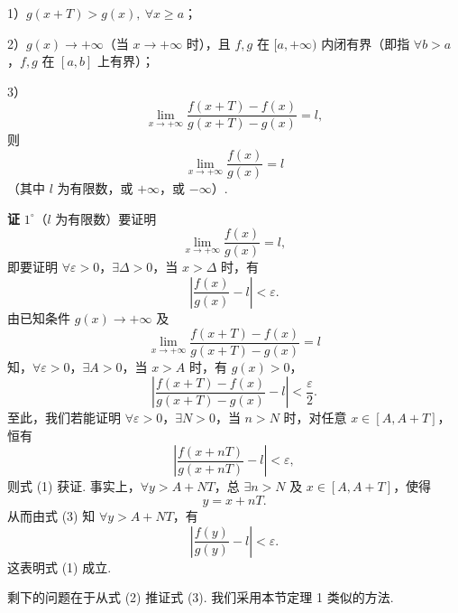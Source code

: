 \documentclass[UTF8, 12pt, fontset=fandol, oneside]{ctexart}
\begin{document}
1）$g(x+T)>g(x),\ \forall x\ge a$；

2）$g(x)\to+\infty$（当 $x\to+\infty$ 时），且 $f,g$ 在 $[a,+\infty)$ 内闭有界（即指 $\forall b>a$，$f,g$ 在 $[a,b]$ 上有界）；

3）
\[
  \lim_{x\to+\infty}\frac{f(x+T)-f(x)}{g(x+T)-g(x)}=l,
\]
则
\[
  \lim_{x\to+\infty}\frac{f(x)}{g(x)}=l
\]
（其中 $l$ 为有限数，或 $+\infty$，或 $-\infty$）.

\noindent\textbf{证}\quad
$1^\circ$（$l$ 为有限数）要证明
\[
  \lim_{x\to+\infty}\frac{f(x)}{g(x)}=l,
\]
即要证明 $\forall\varepsilon>0$，$\exists\Delta>0$，当 $x>\Delta$ 时，有
\[
  \left|\frac{f(x)}{g(x)}-l\right|<\varepsilon. \tag{1}
\]
由已知条件 $g(x)\to+\infty$ 及
\[
  \lim_{x\to+\infty}\frac{f(x+T)-f(x)}{g(x+T)-g(x)}=l
\]
知，$\forall\varepsilon>0$，$\exists A>0$，当 $x>A$ 时，有 $g(x)>0$，
\[
  \left|\frac{f(x+T)-f(x)}{g(x+T)-g(x)}-l\right|<\frac\varepsilon2. \tag{2}
\]
至此，我们若能证明 $\forall\varepsilon>0$，$\exists N>0$，当 $n>N$ 时，对任意
$x\in[A,A+T]$，恒有
\[
  \left|\frac{f(x+nT)}{g(x+nT)}-l\right|<\varepsilon, \tag{3}
\]
则式 (1) 获证. 事实上，$\forall y>A+NT$，总 $\exists n>N$ 及
$x\in[A,A+T]$，使得
\[
  y=x+nT.
\]
从而由式 (3) 知 $\forall y>A+NT$，有
\[
  \left|\frac{f(y)}{g(y)}-l\right|<\varepsilon.
\]
这表明式 (1) 成立.

剩下的问题在于从式 (2) 推证式 (3). 我们采用本节定理 1 类似的方法.
\end{document}
